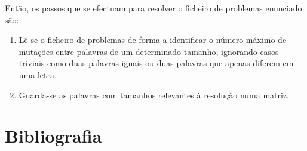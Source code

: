 \documentclass[a4paper, 11pt]{article}
\begin{document}
    \par Então, os passos que se efectuam para resolver o ficheiro de problemas enunciado são:
    
    \begin{enumerate}[align=left]
        \item Lê-se o ficheiro de problemas de forma a identificar o número máximo de mutações entre palavras de um determinado tamanho, ignorando casos triviais como duas palavras iguais ou duas palavras que apenas diferem em uma letra.
        \item Guarda-se as palavras com tamanhos relevantes à resolução numa matriz.
    \end{enumerate}

\section{Bibliografia}
\end{document}
